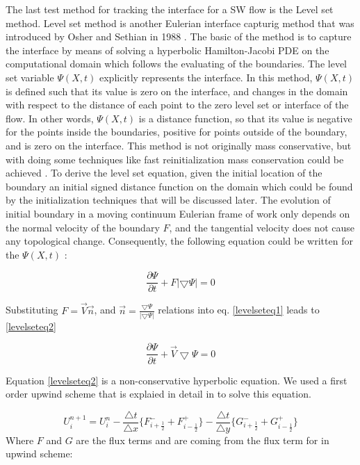 \documentclass[letterpaper,10pt]{article}
\begin{document}
The last test method for tracking the interface for a SW flow is the Level set method.
Level set method is another Eulerian interface capturig method that was introduced by Osher and Sethian in 1988 \cite{}.
The basic of the method is to capture the interface by means of solving a hyperbolic Hamilton-Jacobi PDE on 
the computational domain which follows the evaluating of the boundaries. The level set variable $\varPsi (X,t)$ explicitly 
represents the interface. In this method, $\varPsi (X,t)$ is defined such that its value is zero on the interface, and 
changes in the domain with respect to the distance of each point to the zero level set or interface of the flow. 
In other words, $\varPsi (X,t)$  is a distance function, so that its value is negative for the points inside the boundaries, 
positive for points outside of the boundary, and is zero on the interface. 
This method is not originally mass conservative, but with doing some 
techniques like fast reinitialization mass conservation could be achieved \cite{}. 
To derive the level set equation, given the initial location of the boundary an initial signed distance function on 
the domain which could be found by the initialization techniques that will be discussed later. The evolution of initial 
boundary in a moving continuum Eulerian frame of work only depends on the normal velocity of the boundary $F$, 
and the tangential velocity does not cause any topological change. Consequently, the following equation could 
be written for the $\varPsi (X,t)$ :

\begin{equation}\label{levelseteq1}
 \frac{\partial \varPsi}{\partial t} + F |\bigtriangledown \varPsi| = 0
\end{equation}

Substituting $F = \overrightarrow{V} \overrightarrow{n} $, and 
$\overrightarrow{n} = \frac{\bigtriangledown \varPsi}{|\bigtriangledown \varPsi|}$
relations into eq. \eqref{levelseteq1} leads to \eqref{levelseteq2}

\begin{equation}\label{levelseteq2}
 \frac{\partial \varPsi}{\partial t} + \overrightarrow{V} \bigtriangledown \varPsi = 0
\end{equation}

Equation \eqref{levelseteq2} is a non-conservative hyperbolic equation. We used a first order upwind scheme  that is 
explaied in detail in \cite{} to solve this equation. 

\begin{equation}
   \label{explicit}
   U_i^{n+1} = U_i^n - \frac{\bigtriangleup t}{\bigtriangleup x} \{F_{i+\frac{1}{2}}^- + F_{i-\frac{1}{2}}^+ \}
   - \frac{\bigtriangleup t}{\bigtriangleup y} \{G_{i+\frac{1}{2}}^- + G_{i-\frac{1}{2}}^+ \}
  \end{equation}
Where $F$ and $G$ are the flux terms and are coming from the flux term for in upwind scheme:
\end{document}
